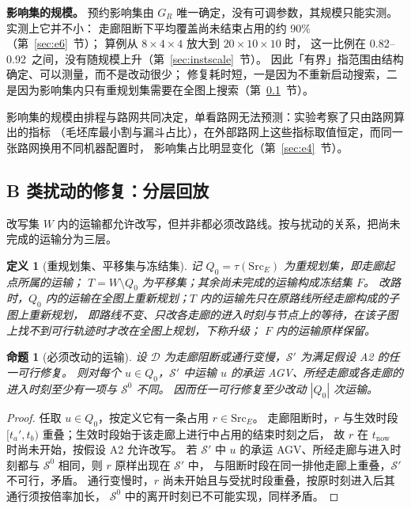 \documentclass[manuscript,screen,review]{acmart}
\newcommand{\ClosureAliveFrac}{90\%}
\newcommand{\ScaleJobsHi}{20}
\newcommand{\ScaleMachHi}{10}
\newcommand{\ScaleCloAliveLo}{0.82}  %
\newcommand{\ScaleCloAliveHi}{0.92}  %
\newtheorem{definition}{定义}
\newtheorem{prop}{命题}
\begin{document}
\textbf{影响集的规模。}
\label{sec:structure}
预约影响集由 \(G_R\) 唯一确定，没有可调参数，其规模只能实测。实测上它并不小：
走廊阻断下平均覆盖尚未结束占用的约 \ClosureAliveFrac（第~\ref{sec:e6}~节）；
算例从 \(8\times4\times4\) 放大到 \(\ScaleJobsHi\times\ScaleMachHi\times\ScaleMachHi\) 时，
这一比例在 \ScaleCloAliveLo--\ScaleCloAliveHi\ 之间，没有随规模上升（第~\ref{sec:instscale}~节）。
因此「有界」指范围由结构确定、可以测量，而不是改动很少；
修复耗时短，一是因为不重新启动搜索，二是因为影响集内只有重规划集需要在全图上搜索（第~\ref{sec:level1}~节）。

影响集的规模由排程与路网共同决定，单看路网无法预测：实验考察了只由路网算出的指标
（毛坯库最小割与漏斗占比），在外部路网上这些指标取值恒定，而同一张路网换用不同机器配置时，
影响集占比明显变化（第~\ref{sec:e4}~节）。

\subsection{B 类扰动的修复：分层回放}
\label{sec:level1}

改写集 \(W\) 内的运输都允许改写，但并非都必须改路线。按与扰动的关系，把尚未完成的运输分为三层。

\begin{definition}[重规划集、平移集与冻结集]
\label{def:tiers}
记 \(Q_0=\tau(\mathrm{Src}_E)\) 为\emph{重规划集}，即走廊起点所属的运输；
\(T=W\setminus Q_0\) 为\emph{平移集}；其余尚未完成的运输构成\emph{冻结集} \(F\)。
改路时，\(Q_0\) 内的运输在全图上重新规划；\(T\) 内的运输先只在原路线所经走廊构成的子图上重新规划，
即路线不变、只改各走廊的进入时刻与节点上的等待，在该子图上找不到可行轨迹时才改在全图上规划，下称\emph{升级}；
\(F\) 内的运输原样保留。
\end{definition}

\begin{prop}[必须改动的运输]
\label{prop:must}
设 \(\mathcal{D}\) 为走廊阻断或通行变慢，\(\mathcal{S}'\) 为满足假设 A2 的任一可行修复。
则对每个 \(u\in Q_0\)，\(\mathcal{S}'\) 中运输 \(u\) 的承运 AGV、所经走廊或各走廊的进入时刻至少有一项与 \(\mathcal{S}^0\) 不同。
因而任一可行修复至少改动 \(|Q_0|\) 次运输。
\end{prop}

\begin{proof}
任取 \(u\in Q_0\)，按定义它有一条占用 \(r\in\mathrm{Src}_E\)。
走廊阻断时，\(r\) 与生效时段 \([t_a',t_b)\) 重叠；生效时段始于该走廊上进行中占用的结束时刻之后，
故 \(r\) 在 \(t_{\mathrm{now}}\) 时尚未开始，按假设 A2 允许改写。
若 \(\mathcal{S}'\) 中 \(u\) 的承运 AGV、所经走廊与进入时刻都与 \(\mathcal{S}^0\) 相同，则 \(r\) 原样出现在 \(\mathcal{S}'\) 中，
与阻断时段在同一排他走廊上重叠，\(\mathcal{S}'\) 不可行，矛盾。
通行变慢时，\(r\) 尚未开始且与受扰时段重叠，按原时刻进入后其通行须按倍率加长，
\(\mathcal{S}^0\) 中的离开时刻已不可能实现，同样矛盾。
\end{proof}
\end{document}
